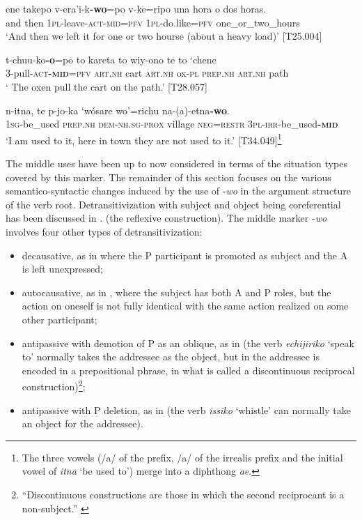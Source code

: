 \documentclass[output=paper]{langscibook}
\begin{document}
\ea
\label{ex:Rose:40}
\gll ene takepo v-era'i-k\textbf{-wo}=po v-ke=ripo {una hora o dos horas}.\\
and then 1\textsc{pl}-leave-\textsc{act-mid=pfv} \textsc{1pl}-do.like=\textsc{pfv} one\_or\_two\_hours\\
\glt ‘And then we left it for one or two hourse (about a heavy load)’ [T25.004]
\z

\ea
\label{ex:Rose:41}
\gll t-chuu-ko\textbf{-o}=po to kareta to wiy-ono te to `chene\\
3-pull-\textsc{act\textbf{-mid}=pfv} \textsc{art.nh} cart \textsc{art.nh} ox-\textsc{pl} \textsc{prep.nh} \textsc{art.nh} path\\
\glt ‘ The oxen pull the cart on the path.’ [T28.057]
\z

\ea
\label{ex:Rose:42}
\gll n-itna, te p-jo-ka `wósare wo'=richu na-(a)-etna\textbf{-wo}.\label{bkm:Ref33103088}\\
1\textsc{sg}-be\_used \textsc{prep.nh} \textsc{dem-nh.sg-prox} village \textsc{neg=restr} \textsc{3pl}-\textsc{irr}-be\_used\textbf{-}\textsc{\textbf{mid}}\\
\glt ‘I am used to it, here in town they are not used to it.’ [T34.049]\footnote{The three vowels (/a/ of the prefix, /a/ of the irrealis prefix and the initial vowel of \textit{itna} ‘be used to’) merge into a diphthong \textit{ae}.}
\z


The middle uses have been up to now considered in terms of the situation types covered by this marker. The remainder of this section focuses on the various semantico-syntactic changes induced by the use of -\textit{wo} in the argument structure of the verb root. Detransitivization with subject and object being coreferential has been discussed in . (the reflexive construction). The middle marker -\textit{wo} involves four other types of detransitivization:


\begin{itemize}
\item decausative, as in  where the P participant is promoted as subject and the A is left unexpressed;
\item autocausative, as in , where the subject has both A and P roles, but the action on oneself is not fully identical with the same action realized on some other participant;
\item antipassive with demotion of P as an oblique, as in  (the verb \textit{echijiriko} ‘speak to’ normally takes the addressee as the object, but in  the addressee is encoded in a prepositional phrase, in what is called a discontinuous reciprocal construction)\footnote{“Discontinuous constructions are those in which the second reciprocant is a non-subject.” \citep[396]{NedjalkovGeniusiene2007}};
\item antipassive with P deletion, as in  (the verb \textit{issiko} ‘whistle’ can normally take an object for the addressee).
\end{itemize}
\end{document}
